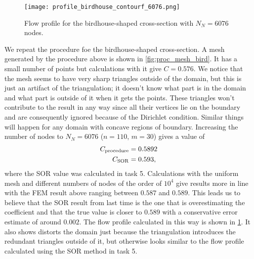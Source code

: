 \documentclass[10pt,a4paper,twocolumn]{article}
\begin{document}
\begin{figure}[!t]
    \centering
    \texttt{[image: profile\_birdhouse\_contourf\_6076.png]}
    \caption{Flow profile for the birdhouse-shaped cross-section with $N_N = 6076$ nodes.}
    \label{fig:flow_bird}
\end{figure}

We repeat the procedure foe the birdhouse-shaped cross-section. A mesh generated by the procedure above is shown in \cref{fig:proc_mesh_bird}. It has a small number of points but calculations with it give $C=0.576$. We notice that the mesh seems to have very sharp triangles outside of the domain, but this is just an artifact of the triangulation; it doesn't know what part is in the domain and what part is outside of it when it gets the points. These triangles won't contribute to the result in any way since all their vertices lie on the boundary and are consequently ignored because of the Dirichlet condition. Similar things will happen for any domain with concave regions of boundary. Increasing the number of nodes to $N_N = 6076$ ($n=110$, $m=30$) gives a value of
%
\begin{align}
    C_{\mathrm{procedure}} &= 0.5892 \notag\\
    C_{\mathrm{SOR}} &= 0.593,
\end{align}
%
where the SOR value was calculated in task 5. Calculations with the uniform mesh and different numbers of nodes of the order of $10^4$ give results more in line with the FEM result above ranging between $0.587$ and $0.589$. This leads us to believe that the SOR result from last time is the one that is overestimating the coefficient and that the true value is closer to $0.589$ with a conservative error estimate of around $0.002$. The flow profile calculated in this way is shown in \cref{fig:flow_bird}. It also shows distorts the domain just because the triangulation introduces the redundant triangles outside of it, but otherwise looks similar to the flow profile calculated using the SOR method in task 5.


\printbibliography
\end{document}
